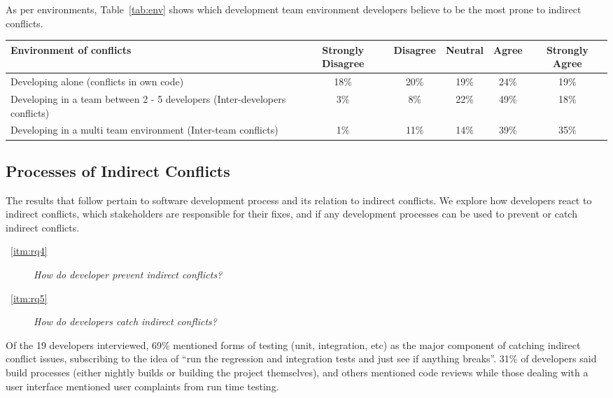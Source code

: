\documentclass[conference]{IEEEtran}
\begin{document}
As per environments, Table~\ref{tab:env} shows which development team environment developers believe to be the most
prone to indirect conflicts.

\begin{table*}[tb!]
\begin{center}
\begin{tabular}{| p{7cm} | c | c | c | c | c |}
\hline
Environment of conflicts & Strongly Disagree & Disagree & Neutral & Agree & Strongly Agree \\
\hline
\hline
Developing alone (conflicts in own code) & 18\% & 20\% & 19\% & 24\% & 19\% \\ \hline
Developing in a team between 2 - 5 developers (Inter-developers conflicts) & 3\% & 8\% & 22\% & 49\% & 18\% \\ \hline
Developing in a multi team environment (Inter-team conflicts) & 1\% & 11\% & 14\% & 39\% & 35\% \\ \hline
\end{tabular}
\end{center}
\caption{Results of survey questions to development environments in which indirect conflicts are likely to occur, in terms of percentage
of developers surveyed.\label{tab:env}}
\end{table*}

\subsection{Processes of Indirect Conflicts}

The results that follow pertain to software development process and its relation to indirect conflicts. We explore
how developers react to indirect conflicts, which stakeholders are responsible for their fixes, and if any development
processes can be used to prevent or catch indirect conflicts.

\begin{description}
	\item[~\ref{itm:rq4}] \textit{How do developer prevent indirect conflicts?}
\end{description}


\begin{description}
	\item[~\ref{itm:rq5}] \textit{How do developers catch indirect conflicts?}
\end{description}

Of the 19 developers interviewed, 69\% mentioned forms of testing (unit, integration, etc) as the major component of catching indirect
conflict issues, subscribing to the idea of ``run the regression and integration tests and just see if anything breaks''. 31\% of developers 
said build processes (either nightly builds or building the project themselves), and others mentioned code reviews
while those dealing with a user interface mentioned user complaints from run time testing.
\end{document}
